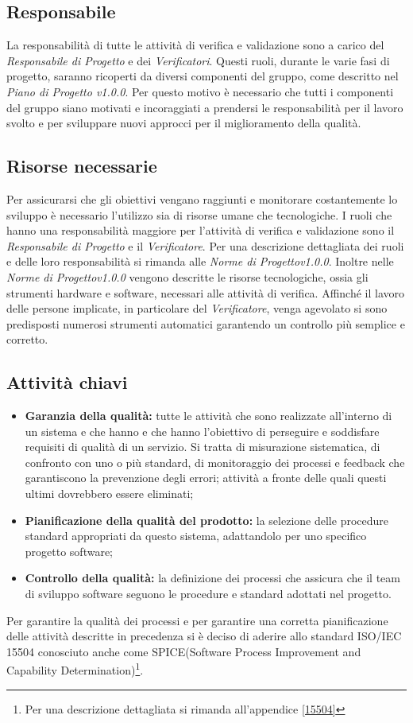 \subsection{Responsabile}
La responsabilità di tutte le attività di verifica e validazione sono a carico del \textit{Responsabile di Progetto} e dei \textit{Verificatori}. Questi ruoli, durante le varie fasi di progetto, saranno ricoperti da diversi componenti del gruppo, come descritto nel \textit{Piano di Progetto v1.0.0}. Per questo motivo è necessario che tutti i componenti del gruppo siano motivati e incoraggiati a prendersi le responsabilità per il lavoro svolto e per sviluppare nuovi approcci per il miglioramento della qualità.

\subsection{Risorse necessarie}
Per assicurarsi che gli obiettivi vengano raggiunti e monitorare costantemente lo sviluppo è necessario l'utilizzo sia di risorse umane che tecnologiche. I ruoli che hanno una responsabilità maggiore per l'attività di verifica e validazione sono il \textit{Responsabile di Progetto} e il \textit{Verificatore}. Per una descrizione dettagliata dei ruoli e delle loro responsabilità si rimanda alle \textit{Norme di Progettov1.0.0}. Inoltre nelle \textit{Norme di Progettov1.0.0} vengono descritte le risorse tecnologiche, ossia gli strumenti hardware e software, necessari alle attività di verifica. Affinché il lavoro delle persone implicate, in particolare del \textit{Verificatore}, venga agevolato si sono predisposti numerosi strumenti automatici garantendo un controllo più semplice e corretto.

\subsection{Attività chiavi}
\begin{itemize}
	\item \textbf{Garanzia della qualità:} tutte le attività che sono realizzate all'interno di un sistema e che hanno e che hanno l'obiettivo di perseguire e soddisfare requisiti di qualità di un servizio. Si tratta di misurazione sistematica, di confronto con uno o più standard, di monitoraggio dei processi e feedback che garantiscono la prevenzione degli errori; attività a fronte delle quali questi ultimi dovrebbero essere eliminati;
	\item \textbf{Pianificazione della qualità del prodotto:} la selezione delle procedure standard appropriati da questo sistema, adattandolo per uno specifico progetto software;
	\item \textbf{Controllo della qualità:} la definizione dei processi che assicura che il team  di sviluppo software seguono le procedure e standard adottati nel progetto.
\end{itemize}
Per garantire la qualità dei processi e per garantire una corretta pianificazione delle attività descritte in precedenza si è deciso di aderire allo standard ISO/IEC 15504 conosciuto anche come SPICE(Software Process Improvement and Capability Determination)\footnote{Per una descrizione dettagliata si rimanda all'appendice \ref{15504}}.
\newpage
